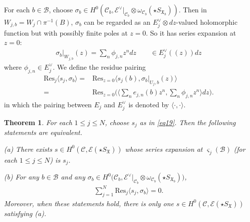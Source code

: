 \documentclass[12pt,a4paper,notitlepage]{article}
\theoremstyle{definition}
\theoremstyle{plain}
\newtheorem{thm}[df]{Theorem}
\newcommand{\fk}{\mathfrak}
\newcommand{\mc}{\mathcal}
\newcommand{\Res}{\mathrm{Res}}
\newcommand{\bk}[1]{\langle {#1}\rangle}
\newcommand{\scr}{\mathscr}
\newcommand{\sgm}{\varsigma}
\newcommand{\SX}{{S_{\fk X}}}
\numberwithin{equation}{section}
\begin{document}
For each $b\in\mc B$, choose $\sigma_b\in H^0(\mc C_b,\scr E^\vee|_{\mc C_b}\otimes\omega_{\mc C_b}(\star S_{\fk X_b}))$. Then in $W_{j,b}=W_j\cap\pi^{-1}(B)$, $\sigma_b$ can be regarded as an $E_j^\vee\otimes dz$-valued holomorphic function but with possibly finite poles at $z=0$. So it has series expansion at $z=0$:
\begin{align*}
\sigma_b|_{W_{j,b}}(z)=\sum_n\phi_{j,n}z^ndz\qquad \in E_j^\vee((z))dz	
\end{align*}
where $\phi_{j,n}\in E_j^\vee$. We define the residue pairing
\begin{align}
\Res_j \bk{s_j,\sigma_b}=&\Res_{z=0}\langle s_j(b),\sigma_b|_{U_j,b}(z) \rangle\nonumber\\
=&\Res_{z=0}\bigg(\Big\langle \sum_n e_{j,n}(b)z^n, \sum_n \phi_{j,n}z^n  \Big\rangle dz\bigg).
\end{align} 
in which the pairing between $E_j$ and $E_j^\vee$ is denoted by $\bk{\cdot,\cdot}$.

\begin{thm}\label{lb7}
For each $1\leq j\leq N$, choose $s_j$ as in \eqref{eq19}.  Then the following statements are equivalent.
	
	(a) There exists $s\in H^0(\mc C,\scr E(\star\SX))$ whose series expansion at $\sgm_j(\mc B)$ (for each $1\leq j\leq N$) is $s_j$.
	
	(b) For any $b\in\mc B$ and any $\sigma_b\in H^0\big(\mc C_b,\scr E^\vee|_{\mc C_b}\otimes\omega_{\mc C_b}(\star S_{\fk X_b})\big)$,
	\begin{align}
		\sum_{j=1}^N\Res_j\bk{s_j,\sigma_b}=0.
	\end{align}
	Moreover, when these statements hold, there is only one $s\in H^0(\mc C,\scr E(\star\SX))$ satisfying (a).
\end{thm}
\end{document}
